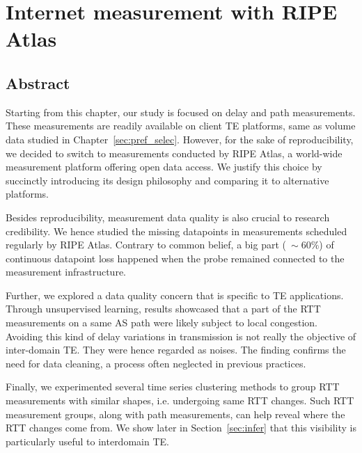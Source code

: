 \chapter{Internet measurement with RIPE Atlas}
\label{sec:ripe_atlas}
\section*{Abstract}

Starting from this chapter, our study is focused on delay and path measurements.
These measurements are readily available on client TE platforms, same as volume data studied in Chapter~\ref{sec:pref_selec}.
However, for the sake of reproducibility, we decided to switch to measurements conducted by RIPE Atlas, a world-wide measurement platform offering open data access. We justify this choice by succinctly introducing its design philosophy and comparing it to alternative platforms.


Besides reproducibility, measurement data quality is also crucial to research credibility.
We hence studied the missing datapoints in measurements scheduled regularly by RIPE Atlas. 
Contrary to common belief, a big part ($~\sim 60\%$) of continuous datapoint loss happened when the probe remained connected to the measurement infrastructure.

Further, we explored a data quality concern that is specific to TE applications.
Through unsupervised learning, results showcased that a part of the RTT measurements on a same AS path were likely subject to local congestion.
Avoiding this kind of delay variations in transmission is not really the objective of inter-domain TE.
They were hence regarded as noises.
The finding confirms the need for data cleaning, a process often neglected in previous practices.

Finally, we experimented several time series clustering methods to group RTT measurements with similar shapes, i.e. undergoing same RTT changes.
Such RTT measurement groups, along with path measurements, can help reveal where the RTT changes come from.
We show later in Section~\ref{sec:infer} that this visibility is particularly useful to interdomain TE.
\clearpage

